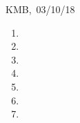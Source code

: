 \documentclass[10pt]{article}
\begin{document}
\begin{flushright} KMB,\ 03/10/18\end{flushright}


\begin{enumerate}
\item
\item
\item
\item
\item
\item
\item
\end{enumerate}
\end{document}
